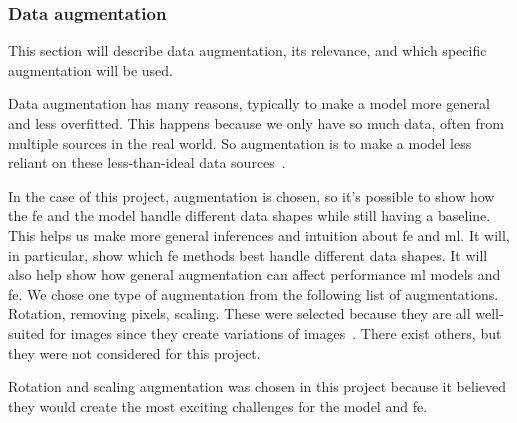 \subsubsection{Data augmentation}\label{subsec:data-augmentation}
This section will describe data augmentation, its relevance, and which specific augmentation will be used.


Data augmentation has many reasons, typically to make a model more general and less overfitted. This happens because we only have so much data, often from multiple sources in the real world. So augmentation is to make a model less reliant on these less-than-ideal data sources~\cite {MAHARANA202291}.

In the case of this project, augmentation is chosen, so it's possible to show how the \gls{fe} and the model handle different data shapes while still having a baseline. This helps us make more general inferences and intuition about \gls{fe} and \gls{ml}. It will, in particular, show which \gls{fe} methods best handle different data shapes. It will also help show how general augmentation can affect performance \gls{ml} models and \gls{fe}.
We chose one type of augmentation from the following list of augmentations. Rotation, removing pixels, scaling. These were selected because they are all well-suited for images since they create variations of images~\cite{gonzalez2008digital}. There exist others, but they were not considered for this project. 

Rotation and scaling augmentation was chosen in this project because it believed they would create the most exciting challenges for the model and \gls{fe}. 





